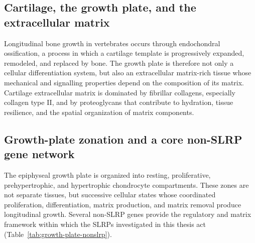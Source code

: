 \subsection{Cartilage, the growth plate, and the extracellular matrix}
\label{subsec:cartilage-growth-plate-ecm}

Longitudinal bone growth in vertebrates occurs through endochondral ossification, a process in which a cartilage template is progressively expanded, remodeled, and replaced by bone. The growth plate is therefore not only a cellular differentiation system, but also an extracellular matrix-rich tissue whose mechanical and signalling properties depend on the composition of its matrix.
Cartilage extracellular matrix is dominated by fibrillar collagens, especially collagen type II, and by proteoglycans that contribute to hydration, tissue resilience, and the spatial organization of matrix components.

\subsection{Growth-plate zonation and a core non-SLRP gene network}
\label{subsec:growth-plate-nonslrp-network}

The epiphyseal growth plate is organized into resting, proliferative,
prehypertrophic, and hypertrophic chondrocyte compartments. These zones are
not separate tissues, but successive cellular states whose coordinated
proliferation, differentiation, matrix production, and matrix removal produce
longitudinal growth. Several non-SLRP genes provide the regulatory and matrix
framework within which the SLRPs investigated in this thesis act
(Table~\ref{tab:growth-plate-nonslrp}).


